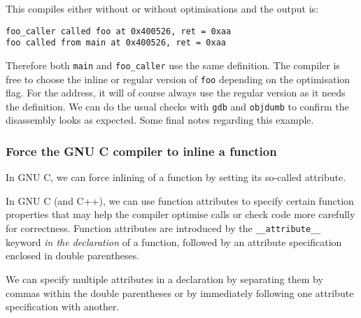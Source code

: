 This compiles either without or without optimisations and the output is:
\begin{verbatim}
foo_caller called foo at 0x400526, ret = 0xaa
foo called from main at 0x400526, ret = 0xaa
\end{verbatim}
Therefore both \texttt{main} and \texttt{foo\_caller} use the same definition. The compiler is free to choose the inline or regular version of \texttt{foo} depending on the optimisation flag. For the address, it will of course always use the regular version as it needs the definition. We can do the usual checks with \texttt{gdb} and \texttt{objdumb} to confirm the disassembly looks as expected. Some final notes regarding this example.




\subsubsection{Force the GNU C compiler to inline a function}

In GNU C, we can force inlining of a function by setting its so-called attribute.

In GNU C (and C++), we can use function attributes to specify certain function properties that may help the compiler optimise calls or check code more carefully for correctness. Function attributes are introduced by the \texttt{\_\_attribute\_\_} keyword \textit{in the declaration} of a function, followed by an attribute specification enclosed in double parentheses.

We can specify multiple attributes in a declaration by separating them by commas within the double parentheses or by immediately following one attribute specification with another.


